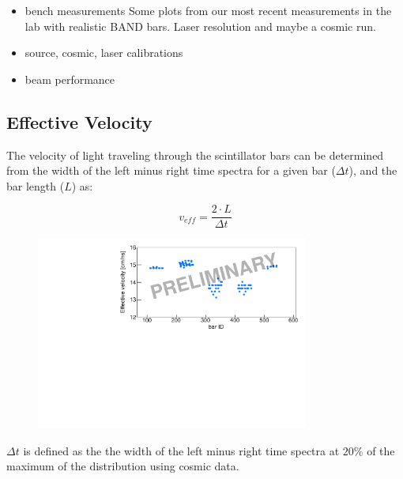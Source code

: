 \documentclass[review]{elsarticle}
\begin{document}
\begin{itemize}
\item bench measurements
Some plots from our most recent measurements in the lab with realistic BAND bars. Laser resolution and maybe a cosmic run.

\item source, cosmic, laser calibrations
\item beam performance
\end{itemize}

\subsection{Effective Velocity}

The velocity of light traveling through the scintillator bars 
can be determined from the width of the left minus right time spectra for a given bar ($\Delta t$), and the bar length ($L$) as:

\begin{equation}
v_{eff} = \frac{2 \cdot L}{\Delta t}
\end{equation}

\begin{figure}[h!]
\centering
\includegraphics[width=0.8\textwidth]{figures/calibrations/eff_velocity.pdf}
\caption{}
\end{figure}

$\Delta t$ is defined as the the width of the left minus right time spectra at $20\%$ of the maximum of the distribution using cosmic data.

\end{document}
